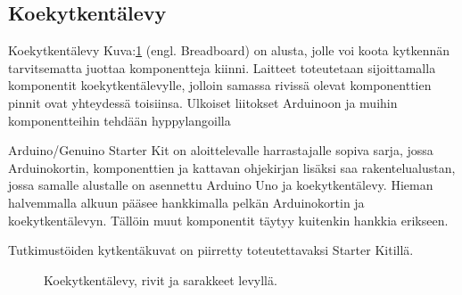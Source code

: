 

\newpage
\subsection*{Koekytkentälevy}
Koekytkentälevy Kuva:\ref{fig:koekytkentalevy} (engl. Breadboard) on alusta, jolle voi koota kytkennän tarvitsematta juottaa komponentteja kiinni. Laitteet toteutetaan sijoittamalla komponentit koekytkentälevylle, jolloin samassa rivissä olevat komponenttien pinnit ovat yhteydessä toisiinsa. Ulkoiset liitokset Arduinoon ja muihin komponentteihin tehdään hyppylangoilla

Arduino/Genuino Starter Kit on aloittelevalle harrastajalle sopiva sarja, jossa Arduinokortin, komponenttien ja kattavan ohjekirjan lisäksi saa rakentelualustan, jossa samalle alustalle on asennettu Arduino Uno ja koekytkentälevy. Hieman halvemmalla alkuun pääsee hankkimalla pelkän Arduinokortin ja koekytkentälevyn. Tällöin muut komponentit täytyy kuitenkin hankkia erikseen.

Tutkimustöiden kytkentäkuvat on piirretty toteutettavaksi Starter Kitillä.



\begin{figure}[h!]
    \centering
    \caption{Koekytkentälevy, rivit ja sarakkeet levyllä. }
    \label{fig:koekytkentalevy}
\end{figure}
\newpage

